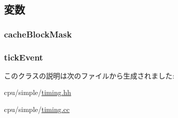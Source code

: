 \subsection{変数}
\hypertarget{classTimingSimpleCPU_1_1DcachePort_af4264b12b32db39099b579e1ed670312}{
\subsubsection[{cacheBlockMask}]{ {\bf cacheBlockMask}}}
\label{classTimingSimpleCPU_1_1DcachePort_af4264b12b32db39099b579e1ed670312}
\hypertarget{classTimingSimpleCPU_1_1DcachePort_a49142331c4285494b26819ad5d97f545}{
\subsubsection[{tickEvent}]{ {\bf tickEvent}}}
\label{classTimingSimpleCPU_1_1DcachePort_a49142331c4285494b26819ad5d97f545}


このクラスの説明は次のファイルから生成されました:\begin{DoxyCompactItemize}
\item 
cpu/simple/\hyperlink{timing_8hh}{timing.hh}\item 
cpu/simple/\hyperlink{timing_8cc}{timing.cc}\end{DoxyCompactItemize}

